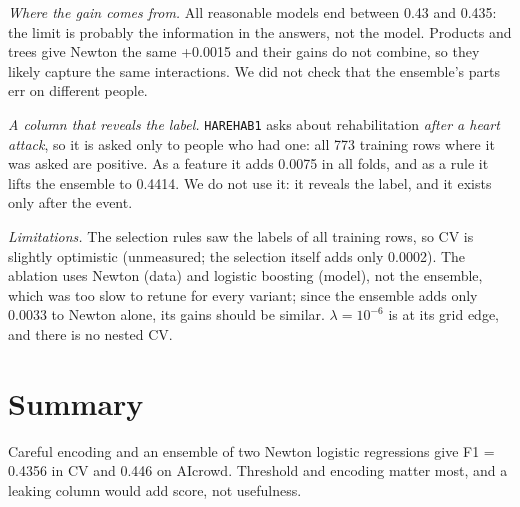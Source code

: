 \documentclass[10pt,conference,compsocconf]{IEEEtran}
\begin{document}
\emph{Where the gain comes from.} All reasonable models end between 0.43 and
0.435: the limit is probably the information in the answers, not the model. Products
and trees give Newton the same +0.0015 and their gains do not combine, so they likely
capture the same interactions. We did not check that the ensemble's parts err on
different people.

\emph{A column that reveals the label.} \texttt{HAREHAB1} asks about rehabilitation
\emph{after a heart attack}, so it is asked only to people who had one: all 773
training rows where it was asked are positive. As a feature it adds 0.0075 in all
folds, and as a rule it lifts the ensemble to 0.4414. We do not use it: it reveals the
label, and it exists only after the event.

\emph{Limitations.} The selection rules saw the labels of all training rows, so CV
is slightly optimistic (unmeasured; the selection itself adds only 0.0002). The
ablation uses Newton (data) and logistic boosting (model), not the ensemble, which was
too slow to retune for every variant; since the ensemble adds only 0.0033 to Newton
alone, its gains should be similar. $\lambda = 10^{-6}$ is at its grid edge,
and there is no nested CV.

\section{Summary}
\label{sec:summary}

Careful encoding and an ensemble of two Newton logistic regressions give F1 =
0.4356 in CV and 0.446 on AIcrowd. Threshold and encoding matter most, and a leaking
column would add score, not usefulness.



\end{document}
